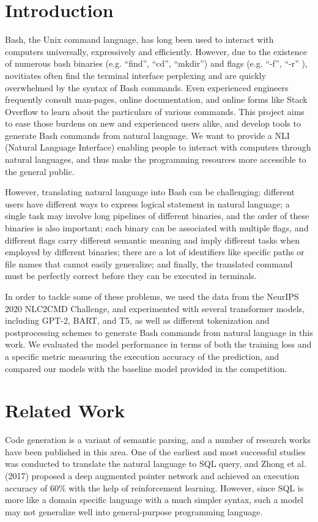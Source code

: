 \section{Introduction}
Bash, the Unix command language, has long been used to interact with computers
universally, expressively and efficiently.  However, due to the existence of
numerous bash binaries (e.g. ``find'', ``cd'', ``mkdir'') and flags (e.g.
``-f'', ``-r'' ), novitiates often find the terminal interface perplexing and
are quickly overwhelmed by the syntax of Bash commands. Even experienced
engineers frequently consult man-pages, online documentation, and online forms
like Stack Overflow to learn about the particulars of various commands. This
project aims to ease those burdens on new and experienced users alike, and
develop tools to generate Bash commands from natural language. We want to
provide a NLI (Natural Language Interface) enabling people to interact with
computers through natural languages, and thus make the programming resources more accessible to the general public.

However, translating natural language into Bash can be challenging: different
users have different ways to express logical statement in natural language; a
single task may involve long pipelines of different binaries, and the order of
these binaries is also important; each binary can be associated with multiple flags, and different flags carry different semantic meaning and imply different tasks when employed by different binaries; there are a lot of identifiers like specific paths or file names that cannot easily generalize; and finally, the translated command must be perfectly correct before
they can be executed in terminals.

In order to tackle some of these problems, we used the data from the NeurIPS 2020 NLC2CMD Challenge, and experimented with several transformer models, including GPT-2, BART, and T5, as well as different tokenization and postprocessing schemes to generate Bash commands from natural language in this work. We evaluated the model performance in terms of both
the training loss and a specific metric measuring the execution accuracy of the prediction, and compared our models with the baseline model provided in the competition.


\section{Related Work}
Code generation is a variant of semantic parsing, and a number of research
works have been published in this area. One of the earliest and most successful
studies was conducted to translate the natural language to SQL query, and Zhong et al. (2017) \cite{zhong2017seq2sql} proposed a deep augmented pointer network and achieved an execution accuracy of 60\% with the help of reinforcement learning. However, since SQL is more like a domain specific language with a much simpler syntax, such a model may not generalize well into general-purpose programming language.

